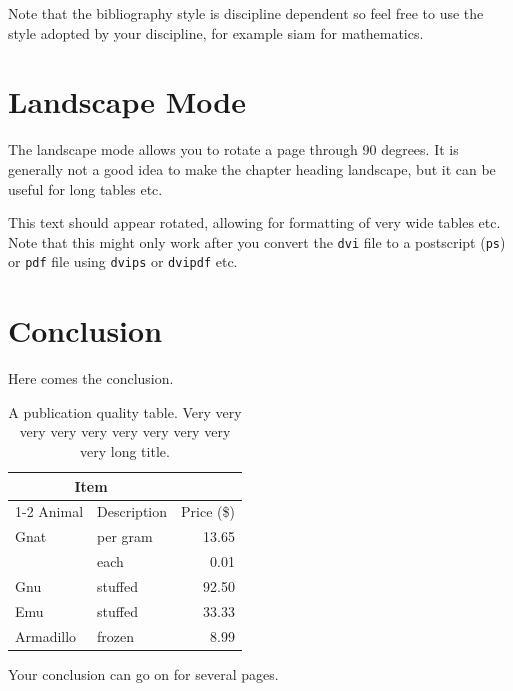 \documentclass[msc,oneside]{ubcthesis}%
\begin{document}
Note that the bibliography style is discipline dependent so feel free to use the style adopted by your discipline, for example siam for mathematics.

\chapter{Landscape Mode}
The landscape mode allows you to rotate a page through 90 degrees.  It
is generally not a good idea to make the chapter heading landscape,
but it can be useful for long tables etc.

\begin{landscape}
  This text should appear rotated, allowing for formatting of very
  wide tables etc.  Note that this might only work after you convert
  the \texttt{dvi} file to a postscript (\texttt{ps}) or \texttt{pdf}
  file using \texttt{dvips} or \texttt{dvipdf} etc.
\end{landscape}

\chapter{Conclusion}
Here comes the conclusion.
\begin{table}[tbph]
\centering
\caption{A publication quality table. Very very very very very very very very very very long title.
\label{table:food1}}
\begin{tabular}{@{}llr@{}} \toprule 
\multicolumn{2}{c}{Item} \\ \cmidrule(r){1-2} 
Animal & Description & Price (\$)\\ \midrule 
Gnat & per gram & 13.65 \\ 
& each & 0.01 \\ 
Gnu & stuffed & 92.50 \\ 
Emu & stuffed & 33.33 \\ 
Armadillo & frozen & 8.99 \\ \bottomrule 
\end{tabular}
\end{table}

\newpage
Your conclusion can go on for several pages.


%


\newpage %
\pagestyle{fancy}\rhead{}\cfoot{}\rfoot{\thepage}
\end{document}
